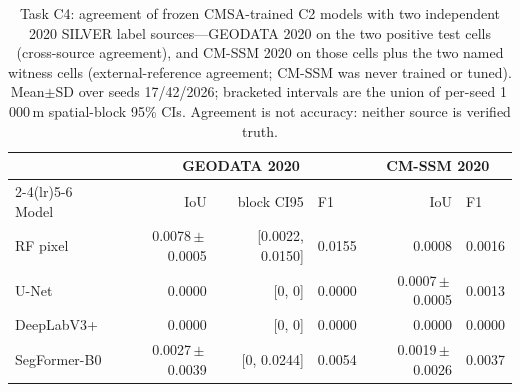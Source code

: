 \begin{table}[t]
\centering
\small
\caption{Task C4: agreement of frozen CMSA-trained C2 models with two
independent 2020 SILVER label sources---GEODATA 2020 on the two positive
test cells (cross-source agreement), and CM-SSM 2020 on those cells plus
the two named witness cells (external-reference agreement; CM-SSM was
never trained or tuned). Mean$\pm$SD over seeds 17/42/2026; bracketed
intervals are the union of per-seed 1\,000\,m spatial-block 95\% CIs.
Agreement is not accuracy: neither source is verified truth.}
\label{tab:silverc4}
\begin{tabular}{lrrlrl}
\toprule
& \multicolumn{3}{c}{GEODATA 2020} & \multicolumn{2}{c}{CM-SSM 2020} \\
\cmidrule(lr){2-4}\cmidrule(lr){5-6}
Model & IoU & block CI95 & F1 & IoU & F1 \\
\midrule
RF pixel      & 0.0078\,$\pm$\,0.0005 & [0.0022, 0.0150] & 0.0155 & 0.0008 & 0.0016 \\
U-Net         & 0.0000 & [0, 0] & 0.0000 & 0.0007\,$\pm$\,0.0005 & 0.0013 \\
DeepLabV3+    & 0.0000 & [0, 0] & 0.0000 & 0.0000 & 0.0000 \\
SegFormer-B0  & 0.0027\,$\pm$\,0.0039 & [0, 0.0244] & 0.0054 & 0.0019\,$\pm$\,0.0026 & 0.0037 \\
\bottomrule
\end{tabular}
\end{table}
